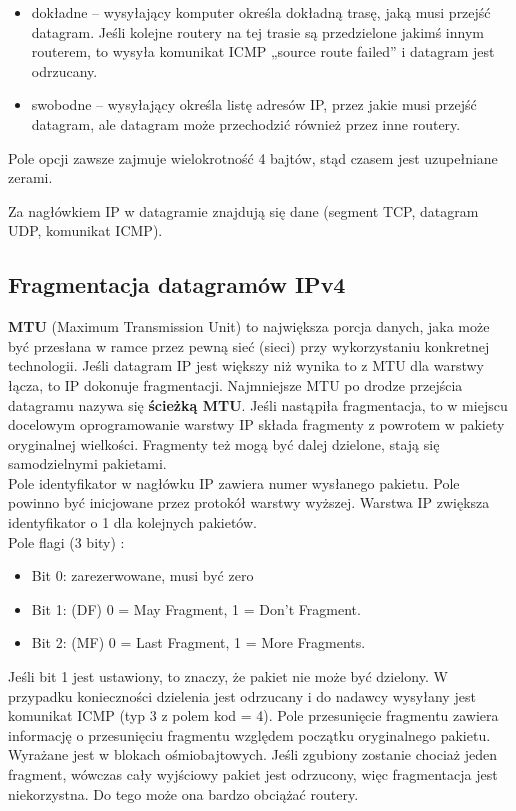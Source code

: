 \documentclass[a4paper]{article}
\begin{document}
\begin{itemize}
\begin{itemize}
        \begin{itemize}
            \item  dokładne – wysyłający komputer określa dokładną trasę, jaką musi przejść datagram. Jeśli kolejne routery na tej trasie są przedzielone jakimś innym routerem, to wysyła komunikat ICMP „source route failed” i datagram jest odrzucany.
            \item swobodne – wysyłający określa listę adresów IP, przez jakie musi przejść datagram, ale datagram może przechodzić również przez inne routery.
        \end{itemize}
    \end{itemize}
    Pole opcji zawsze zajmuje wielokrotność 4 bajtów, stąd czasem jest uzupełniane zerami.
\end{itemize}
Za nagłówkiem IP w datagramie znajdują się dane (segment TCP, datagram UDP, komunikat ICMP).

\subsection{Fragmentacja datagramów IPv4}
\textbf{MTU} (Maximum Transmission Unit) to największa porcja danych, jaka może być przesłana w ramce przez pewną sieć (sieci) przy wykorzystaniu konkretnej technologii. Jeśli datagram IP jest większy niż wynika to z MTU dla warstwy łącza, to IP dokonuje fragmentacji. Najmniejsze MTU po drodze przejścia datagramu nazywa się \textbf{ścieżką MTU}. Jeśli nastąpiła fragmentacja, to w miejscu docelowym oprogramowanie warstwy IP składa fragmenty z powrotem w pakiety oryginalnej wielkości.
Fragmenty też mogą być dalej dzielone, stają się samodzielnymi pakietami.\\

Pole identyfikator w nagłówku IP zawiera numer wysłanego pakietu. Pole powinno być inicjowane przez protokół warstwy wyższej. Warstwa IP zwiększa identyfikator
o 1 dla kolejnych pakietów.\\
Pole flagi (3 bity) :
\begin{itemize}
    \item Bit 0: zarezerwowane, musi być zero
    \item Bit 1: (DF) 0 = May Fragment, 1 = Don't Fragment.
    \item Bit 2: (MF) 0 = Last Fragment, 1 = More Fragments.
\end{itemize}
Jeśli bit 1 jest ustawiony, to znaczy, że pakiet nie może być dzielony. W przypadku konieczności dzielenia jest odrzucany i do nadawcy wysyłany jest
komunikat ICMP (typ 3 z polem kod = 4).
Pole przesunięcie fragmentu zawiera informację o przesunięciu fragmentu względem początku oryginalnego pakietu. Wyrażane jest w blokach ośmiobajtowych.
Jeśli zgubiony zostanie chociaż jeden fragment, wówczas cały wyjściowy pakiet jest odrzucony, więc fragmentacja jest niekorzystna.
Do tego może ona bardzo obciążać routery.
\end{document}
